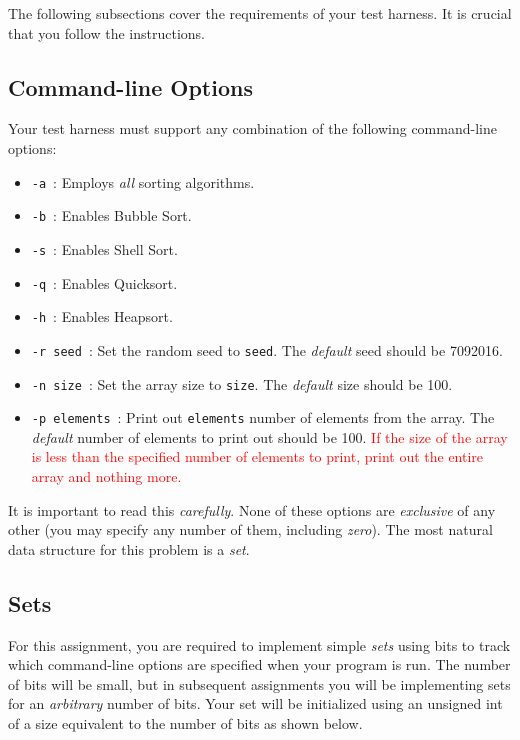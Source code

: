 \documentclass[11pt]{article}
\begin{document}
The following subsections cover the requirements of your test harness.
It is crucial that you follow the instructions.

\subsection{Command-line Options}

Your test harness must support any combination of the following
command-line options:

\begin{itemize}
  \item \texttt{-a}\ : Employs \emph{all} sorting algorithms.
  \item \texttt{-b}\ : Enables Bubble Sort.
  \item \texttt{-s}\ : Enables Shell Sort.
  \item \texttt{-q}\ : Enables Quicksort.
  \item \texttt{-h}\ : Enables Heapsort.
  \item \texttt{-r seed}\ : Set the random seed to \texttt{seed}.
    The \emph{default} seed should be 7092016.
  \item \texttt{-n size}\ : Set the array size to \texttt{size}. The
    \emph{default} size should be 100.
  \item \texttt{-p elements}\ : Print out \texttt{elements} number of
    elements from the array. The \emph{default} number of elements to
    print out should be 100. \textcolor{red}{If the size of the array is
      less than the specified number of elements to print, print out the
    entire array and nothing more.}
\end{itemize}

It is important to read this \emph{carefully}. None of these options are
\emph{exclusive} of any other (you may specify any number of them,
including \emph{zero}). The most natural data structure for this
problem is a \emph{set}.

\subsection{Sets}

For this assignment, you are required to implement simple
\emph{sets} using bits to track which command-line options are specified
when your program is run. The number of bits will be small, but in
subsequent assignments you will be implementing sets for an
\emph{arbitrary} number of bits. Your set will be initialized using an
unsigned int of a size equivalent to the number of bits as shown below.
\end{document}
